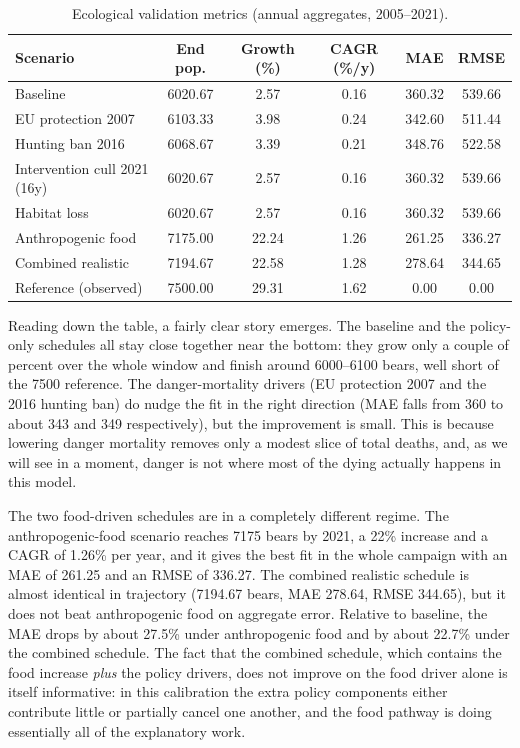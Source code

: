 \begin{table}[htbp]
\centering
\caption{Ecological validation metrics (annual aggregates, 2005--2021).}
\label{tab:ch4_ecology_summary}
\begin{tabular}{|l|c|c|c|c|c|}
\hline
Scenario & End pop. & Growth (\%) & CAGR (\%/y) & MAE & RMSE \\
\hline
Baseline & 6020.67 & 2.57 & 0.16 & 360.32 & 539.66 \\
EU protection 2007 & 6103.33 & 3.98 & 0.24 & 342.60 & 511.44 \\
Hunting ban 2016 & 6068.67 & 3.39 & 0.21 & 348.76 & 522.58 \\
Intervention cull 2021 (16y) & 6020.67 & 2.57 & 0.16 & 360.32 & 539.66 \\
Habitat loss & 6020.67 & 2.57 & 0.16 & 360.32 & 539.66 \\
Anthropogenic food & 7175.00 & 22.24 & 1.26 & 261.25 & 336.27 \\
Combined realistic & 7194.67 & 22.58 & 1.28 & 278.64 & 344.65 \\
\hline
Reference (observed) & 7500.00 & 29.31 & 1.62 & 0.00 & 0.00 \\
\hline
\end{tabular}
\end{table}

Reading down the table, a fairly clear story emerges. The baseline and the policy-only schedules all stay close together near the bottom: they grow only a couple of percent over the whole window and finish around 6000--6100 bears, well short of the 7500 reference. The danger-mortality drivers (EU protection 2007 and the 2016 hunting ban) do nudge the fit in the right direction (MAE falls from 360 to about 343 and 349 respectively), but the improvement is small. This is because lowering danger mortality removes only a modest slice of total deaths, and, as we will see in a moment, danger is not where most of the dying actually happens in this model.

The two food-driven schedules are in a completely different regime. The anthropogenic-food scenario reaches 7175 bears by 2021, a 22\% increase and a CAGR of 1.26\% per year, and it gives the best fit in the whole campaign with an MAE of 261.25 and an RMSE of 336.27. The combined realistic schedule is almost identical in trajectory (7194.67 bears, MAE 278.64, RMSE 344.65), but it does not beat anthropogenic food on aggregate error. Relative to baseline, the MAE drops by about 27.5\% under anthropogenic food and by about 22.7\% under the combined schedule. The fact that the combined schedule, which contains the food increase \emph{plus} the policy drivers, does not improve on the food driver alone is itself informative: in this calibration the extra policy components either contribute little or partially cancel one another, and the food pathway is doing essentially all of the explanatory work.

